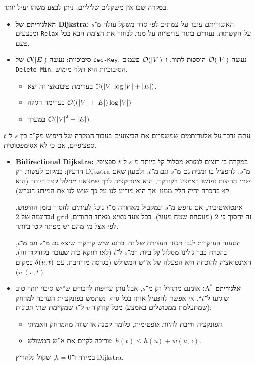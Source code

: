 \documentclass[]{../../../../tex/classes/styledArticle}
\begin{document}
	במקרה שבו אין משקלים שליליים, ניתן לבצע משהו יעיל יותר. 
	\begin{itemize}
		\item \textbf{האלגוריתם של Dijkstra: }האלגוריתם עובר על צמתים לפי סדר משקל עולה מ־$s$ ומבצעים \texttt{Relax} על הקשתות. נעזרים בתור עדיפויות על מנת לבחור את הצומת הבא בכל פעם. 
		\item \textbf{סיבוכיות: }נעשה $\mathcal{O}(\left \lvert E \right \rvert)$ של \texttt{Dec-Key}, נעשה $\mathcal{O}(\left \lvert V \right \rvert)$ הוספות לתור, ו־$\mathcal{O}(\left \lvert V \right \rvert)$ פעמים \texttt{Delete-Min}. הסיבוכיות היא תלוי מימוש. 
		\begin{itemize}
			\item בערימת פיבונאצי זה יצא $\mathcal{O}(\left \lvert V \right \rvert \log \left \lvert V \right \rvert + \left \lvert E \right \rvert)$. 
			\item בערימה רגילה $\mathcal{O}(\left ( \left \lvert V \right \rvert + \left \lvert E \right \rvert \right )\log \left \lvert V \right \rvert)$
			\item במערך $\mathcal{O}(\left \lvert V \right \rvert^2 + \left \lvert E \right \rvert)$
		\end{itemize}
	\end{itemize}
	
	עתה נדבר על אלגוריתמים שמשפרים את הביצועים בעבור המקרה של חיפוש מק''ב בין $s$ ל־$t$ ספציפיים, אם כי לא אסימפטוטית. 
	\begin{itemize}
		\item \textbf{Bidirectional Dijkstra: }במקרה בו רוצים למצוא מסלול קל ביותר מ־$s$ ל־$t$ ספציפי. הרעיון: במקום לעשות רק Dijkstra מ־$s$, להפעיל בו זמנית גם מ־$s$ וגם מ־$t$, ולטעון שאם שתי הריצות נפגשו באמצע בקודקוד, הוא אינדיקציה לכך שמצאנו מסלול קצר ביותר (הוא לא בהכרח יהיה חלק ממנו, אך הוא מודיע לנו על כך שיש לנו את המידע הנגרש). 
		
		אינטואיטיבית, אם נחפש מ־$s$ ובמקביל מאחורה מ־$t$ נוכל לעיתים לחסוך בזמן החיפוש. בדוגמה של 2d grid זה יחסוך פי $2$ (מנוסחת שטח מעגל). בכל צעד נוציא מאחד התורים, לפי אצל מי מהם יש מפתח קטן ביותר. 
		
		הטענה העיקרית לגבי תנאי העצירה של זה: ברגע שיש קודקוד שיצא גם מ־$s$ וגם מ־$t$, בהכרח כבר גילינו מסלול קל ביות רמ־$s$ ל־$t$ (לאו דווקא כזה שעובר בקודקוד זה). האינטואציה להוכחה היא הפעלה של א''ש המשולש (בגרסה מורחבת, עם $\delta(u, t)$ במקום $w(u, t)$). 
		\item \textbf{אלגוריתם $\bm{\mathrm A^*}$: }אומנם מתחיל רק מ־$s$, אבל נותן עדיפות לדברים ש''יש סיכוי יותר טוב שיגיעו ל־$t$``. אי אפשר להפעיל אותו בכל גרף. נשתמש בפונקציית הערכה למרחק (שמתעלמת ממכושלים באמצע) מכל קודקוד $v$ ל־$t$ שמקיימת שתי תכונות: 
		\begin{itemize}
			\item הפונקציה חייבת להיות אופטימית, כלומר קטנה או שווה מהמרחק האמיתי. 
			\item צריכה לקיים את א''ש המשולש: $h(v) \le h(u) + w(u, v)$. 
		\end{itemize}
				במידה ו־$h = 0$, שקול ללהריץ Dijkstra. 
	\end{itemize}
	
\end{document}
